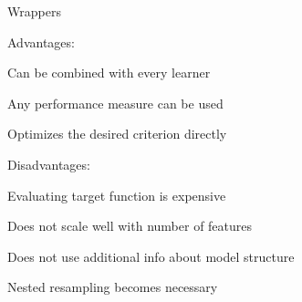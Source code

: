 \documentclass[11pt,compress,t,notes=noshow, xcolor=table]{beamer}
\begin{document}
  \begin{vbframe}{Wrappers}

    \begin{blocki}{Advantages:}
      \item Can be combined with every learner
      \item Any performance measure can be used
      \item Optimizes the desired criterion directly
    \end{blocki}

    \lz

    \begin{blocki}{Disadvantages:}
      \item Evaluating target function is expensive
      \item Does not scale well with number of features%
      \item Does not use additional info about model structure
      \item Nested resampling becomes necessary
    \end{blocki}

  \end{vbframe}


  \endlecture
\end{document}

